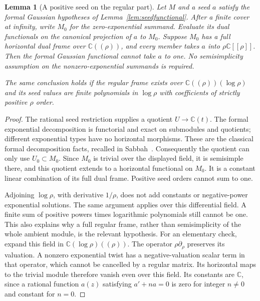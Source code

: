 \documentclass[11pt]{article}
\newtheorem{lemma}[theorem]{Lemma}
\theoremstyle{definition}\newtheorem{definition}[theorem]{Definition}
\theoremstyle{remark}\newtheorem{remark}[theorem]{Remark}
\newcommand{\C}{\mathbb C}
\begin{document}
\begin{lemma}[A positive seed on the regular part]
\label{lem:regularpositiveseed}
Let $M$ and a seed $a$ satisfy the formal Gaussian hypotheses of
Lemma~\ref{lem:seedfunctional}. After a finite cover at infinity,
write $M_0$ for the zero-exponential summand. Evaluate its dual
functionals on the canonical projection of $a$ to $M_0$. Suppose $M_0$ has a
full horizontal dual frame over $\C((\rho))$, and every member
takes $a$ into $\rho\C[[\rho]]$. Then the formal Gaussian
functional cannot take $a$ to one. No semisimplicity assumption
on the nonzero-exponential summands is required.

The same conclusion holds if the regular frame exists over
$\C((\rho))(\log\rho)$ and its seed values are finite
polynomials in $\log\rho$ with coefficients of strictly positive
$\rho$ order.
\end{lemma}
\begin{proof}
The rational seed restriction supplies a quotient $U\to\C(t)$.
The formal exponential decomposition is functorial and exact on
submodules and quotients; different exponential types have no
horizontal morphisms. These are the classical formal decomposition
facts, recalled in Sabbah~\cite[Section~3, Corollary~3.3 and its
proof]{SabbahStationary}. Consequently the quotient can only use
$U_0\subset M_0$. Since $M_0$ is trivial over the displayed field,
it is semisimple there, and this quotient extends to a horizontal
functional on $M_0$. It is a constant linear combination of its
full dual frame. Positive seed orders cannot sum to one.

Adjoining $\log\rho$, with derivative $1/\rho$, does not add
constants or negative-power exponential solutions. The same
argument applies over this differential field. A finite sum of
positive powers times logarithmic polynomials still cannot be
one. This also explains why a full regular frame, rather than
semisimplicity of the whole ambient module, is the relevant
hypothesis.
For an elementary check, expand this field in
$\C(\log\rho)((\rho))$. The operator $\rho\partial_\rho$
preserves its valuation. A nonzero exponential twist has a
negative-valuation scalar term in that operator, which cannot
be cancelled by a regular matrix. Its horizontal maps to the
trivial module therefore vanish even over this field. Its
constants are $\C$, since a rational function $a(z)$ satisfying
$a'+na=0$ is zero for integer $n\ne0$ and constant for $n=0$.
\end{proof}
\end{document}
